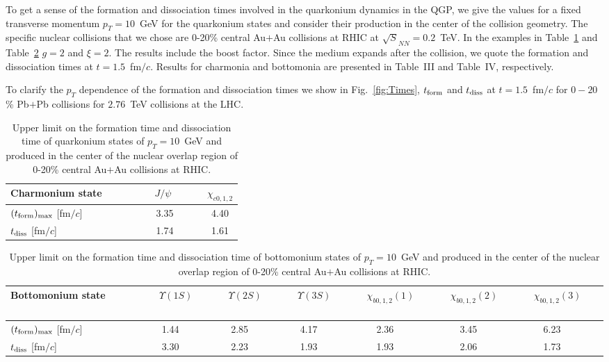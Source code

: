\documentclass[article,showpacs,preprintnumbers,amsmath,amssymb]{revtex4}
\newcommand{\rf}{{\rm form}}
\newcommand{\rd}{{\rm diss}}
\begin{document}
To get a sense of the formation and dissociation times involved in the
quarkonium dynamics in the QGP, we give the values for a fixed transverse
momentum $p_T=10$~GeV for the quarkonium states and consider their production
in the center of the collision geometry. The specific nuclear collisions that
we chose are 0-20\% central Au$+$Au collisions at RHIC at
$\sqrt{S}_{NN}=0.2$~TeV. In the examples in Table~\ref{table:CharmFD} and
Table~\ref{table:BottomFD} $g=2$ and $\xi = 2$. The results include the boost
factor. Since the medium expands after the collision, we quote the formation
and dissociation times at $t = 1.5$~fm$/c$. Results for charmonia and
bottomonia are presented in Table~III and Table~IV, respectively. 

To clarify the $p_T$ dependence of the formation and dissociation times we show
in Fig.~\ref{fig:Times}, $t_\rf$ and $t_\rd$ at $t = 1.5$~fm$/c$ for $0-20$\%
Pb$+$Pb collisions for $2.76$~TeV collisions at the LHC.

\begin{table}[h]
\begin{tabular}{l||cc}
{\rm Charmonium state \ \  \ }   &   \ \ \ \  $J/\psi$ \ \ \ \  &   $\chi_{c0,1,2}$ \\ \hline
{\rm $(t_{\rf})_{\rm max}$  [fm$/c$]\ \  \ }   & 3.35      &    4.40       \\
{\rm $t_{\rd}$  [fm$/c$]\ \  \ }   &   1.74    &   1.61     
\end{tabular}
\caption{Upper limit on the formation time and dissociation time of quarkonium
states of  $p_T=10$~GeV and produced in the center of the nuclear overlap
region of 0-20\% central Au$+$Au collisions at RHIC.}
\label{table:CharmFD}
\end{table}


\begin{table}[h]
\begin{tabular}{l||ccccccc}
 {\rm  Bottomonium state}  \ \   \ \ & \  \  $\Upsilon(1S)$ \ \       &  
 \  \  $\Upsilon(2S)$  \  \    &  \ \  $\Upsilon(3S)$   \  \ &
\ \  $\chi_{b0,1,2}(1)$ \  \ &   \  \ $\chi_{b0,1,2}(2)$ \ \  &
  \ \   $\chi_{b0,1,2}(3)$ \  \   \\ \hline
 {\rm $(t_{\rf})_{\rm max}$  [fm$/c$]\ \  \ }   &     1.44  &  2.85   &  4.17   &    2.36 &  3.45  & 6.23       \\
{\rm  $t_{\rd}$ [fm$/c$]\ \  \ }              &     3.30  &  2.23   &  1.93   &    1.93 &   2.06  &  1.73        
\end{tabular}
\caption{Upper limit on the formation time and dissociation time of bottomonium
states of  $p_T=10$~GeV and produced in the center of the nuclear overlap
region of 0-20\% central Au$+$Au collisions at RHIC.}
\label{table:BottomFD}
\end{table}
\end{document}
